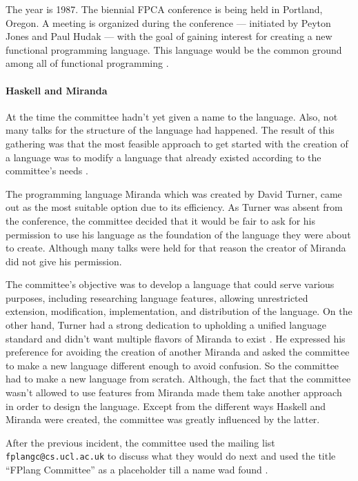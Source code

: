 \documentclass[a4paper, titlepage, twoside]{article}
\begin{document}
The year is 1987. The biennial FPCA conference is being held in Portland, Oregon. A meeting is organized during the conference --- initiated by Peyton Jones and Paul Hudak --- with the goal of gaining interest for creating a new functional programming language. This language would be the common ground among all of functional programming \autocite{hudakHistoryHaskellBeing2007}.

\paragraph*{Haskell and Miranda}
\label{sec:org8e9c48b}

At the time the committee hadn't yet given a name to the language. Also, not many talks for the structure of the
language had happened. The result of this gathering was that the most feasible approach to get started with the creation of a language was to modify a language that already existed according to the committee's needs .

The programming language Miranda \autocite{turnerMirandaNonstrictFunctional1985} which was created by David Turner, came out as the most suitable option due to its efficiency. As Turner was absent from the conference, the committee decided that it would be fair to ask for his permission to use his language as the foundation of the language they were about to create. Although many talks were held for that reason the creator of Miranda did not give his permission. 

The committee's objective was to develop a language that could serve various purposes, including researching language features, allowing unrestricted extension, modification, implementation, and distribution of the language. On the other hand, Turner had a strong dedication to upholding a unified language standard and didn't want multiple flavors of Miranda to exist \autocite{hudakHistoryHaskellBeing2007}. He expressed his preference for avoiding the creation of another Miranda and asked the committee to make a new language different enough to avoid confusion. So the committee had to make a new language from scratch. Although, the fact that the committee wasn't allowed to use features from Miranda made them take another approach in order to design the language. Except from the different ways Haskell and Miranda were created, the committee was greatly influenced by the latter.

After the previous incident, the committee used the mailing list \texttt{fplangc@cs.ucl.ac.uk} to discuss what they would do next and used the title ``FPlang Committee'' as a placeholder till a name wad found \autocite{hudakHistoryHaskellBeing2007}.
\end{document}

